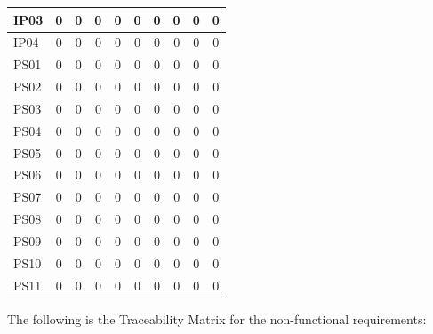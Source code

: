 \documentclass [10pt]{article}
\begin{document}
\begin{longtable}{ | p{} | c | c | c | c | c | c | c | c | c | }
	IP03 & 0 & 0 & 0 & 0 & 0 & 0 & 0 & 0 & 0 \\ \hline
	IP04 & 0 & 0 & 0 & 0 & 0 & 0 & 0 & 0 & 0 \\ \hline
	PS01 & 0 & 0 & 0 & 0 & 0 & 0 & 0 & 0 & 0 \\ \hline
	PS02 & 0 & 0 & 0 & 0 & 0 & 0 & 0 & 0 & 0 \\ \hline
	PS03 & 0 & 0 & 0 & 0 & 0 & 0 & 0 & 0 & 0 \\ \hline
	PS04 & 0 & 0 & 0 & 0 & 0 & 0 & 0 & 0 & 0 \\ \hline
	PS05 & 0 & 0 & 0 & 0 & 0 & 0 & 0 & 0 & 0 \\ \hline
	PS06 & 0 & 0 & 0 & 0 & 0 & 0 & 0 & 0 & 0 \\ \hline
	PS07 & 0 & 0 & 0 & 0 & 0 & 0 & 0 & 0 & 0 \\ \hline
	PS08 & 0 & 0 & 0 & 0 & 0 & 0 & 0 & 0 & 0 \\ \hline
	PS09 & 0 & 0 & 0 & 0 & 0 & 0 & 0 & 0 & 0 \\ \hline
	PS10 & 0 & 0 & 0 & 0 & 0 & 0 & 0 & 0 & 0 \\ \hline
	PS11 & 0 & 0 & 0 & 0 & 0 & 0 & 0 & 0 & 0 \\ \hline
\end{longtable}

The following is the Traceability Matrix for the non-functional requirements: \\
\end{document}
